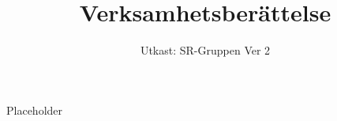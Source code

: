 \documentclass[a4paper]{dtek}
\title{Verksamhetsberättelse}
\date{Utkast: SR-Gruppen Ver 2}
\begin{document}
Placeholder
\end{document}
